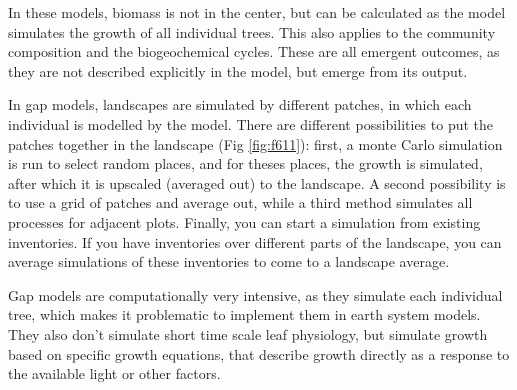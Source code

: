 \documentclass[12pt,oneside]{book}
\begin{document}
In these models, biomass is not in the center, but can be calculated as
the model simulates the growth of all individual trees. This also
applies to the community composition and the biogeochemical cycles.
These are all emergent outcomes, as they are not described explicitly in
the model, but emerge from its output.

In gap models, landscapes are simulated by different patches, in which
each individual is modelled by the model. There are different
possibilities to put the patches together in the landscape (Fig
\ref{fig:f611}): first, a monte Carlo simulation is run to select random
places, and for theses places, the growth is simulated, after which it
is upscaled (averaged out) to the landscape. A second possibility is to
use a grid of patches and average out, while a third method simulates
all processes for adjacent plots. Finally, you can start a simulation
from existing inventories. If you have inventories over different parts
of the landscape, you can average simulations of these inventories to
come to a landscape average.

Gap models are computationally very intensive, as they simulate each
individual tree, which makes it problematic to implement them in earth
system models. They also don't simulate short time scale leaf
physiology, but simulate growth based on specific growth equations, that
describe growth directly as a response to the available light or other
factors.
\end{document}
